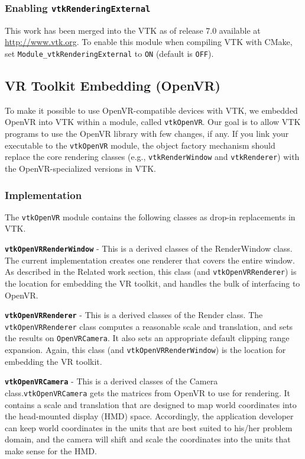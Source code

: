 \subsubsection{Enabling \texttt{vtkRenderingExternal}}

This work has been merged into the VTK as of release 7.0 available at
\url{http://www.vtk.org}.
To enable this module when compiling VTK with CMake,
set \texttt{Module\_vtkRenderingExternal} to \texttt{ON} (default is \texttt{OFF}).

\subsection{VR Toolkit Embedding (OpenVR)}

To make it possible to use OpenVR-compatible devices with VTK, we embedded OpenVR into VTK within a module, called \texttt{vtkOpenVR}.
Our goal is to allow VTK programs to use the OpenVR library with few changes, if any.
If you link your executable to the \texttt{vtkOpenVR} module, the object factory
mechanism should replace the core rendering classes (e.g.,
\texttt{vtkRenderWindow} and \texttt{vtkRenderer}) with the OpenVR-specialized versions in VTK. 

\subsubsection{Implementation}

The \texttt{vtkOpenVR} module contains the following classes as drop-in replacements in VTK.

\textbf{\texttt{vtkOpenVRRenderWindow}} - This is a derived classes of the RenderWindow class.
The current implementation creates one renderer that covers the entire window.
As described in the Related work section, this class (and \texttt{vtkOpenVRRenderer}) is the location for embedding the VR toolkit, and handles the bulk of interfacing to OpenVR. 

\textbf{\texttt{vtkOpenVRRenderer}} - This is a derived classes of the Render class.
The \texttt{vtkOpenVRRenderer} class computes a reasonable scale and translation, and sets the results on \texttt{OpenVRCamera}.
It also sets an appropriate default clipping range expansion.
Again, this class (and \texttt{vtkOpenVRRenderWindow}) is the location for embedding the VR toolkit.

\textbf{\texttt{vtkOpenVRCamera}} - This is a derived classes of the Camera class.\texttt{vtkOpenVRCamera} gets the matrices from OpenVR to use for rendering.
It contains a scale and translation that are designed to map world coordinates into the head-mounted display (HMD) space.
Accordingly, the application developer can keep world coordinates in the units that are best suited to his/her problem domain, and the camera will shift and scale the coordinates into the units that make sense for the HMD.

